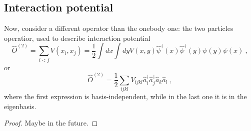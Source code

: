 \subsection{Interaction potential}

    Now, consider a different operator than the onebody one: the two particles operatior, used to describe interaction potential 
    \begin{equation*}
        \hat O^{(2)} = \sum_{i < j} V(x_i, x_j) = \frac{1}{2} \int dx \int dy V(x,y) \hat \psi^\dagger (x) \hat \psi^\dagger (y) \psi(y) \psi (x) ~,
    \end{equation*}
    or 
    \begin{equation*}
        \hat O^{(2)} = \frac{1}{2} \sum_{ijkl} V_{ijkl} \hat a_i^\dagger \hat a_j^\dagger \hat a_k \hat a_l ~,
    \end{equation*}
    where the first expression is basis-independent, while in the last one it is in the eigenbasis. 
    \begin{proof}
        Maybe in the future.
    \end{proof}
